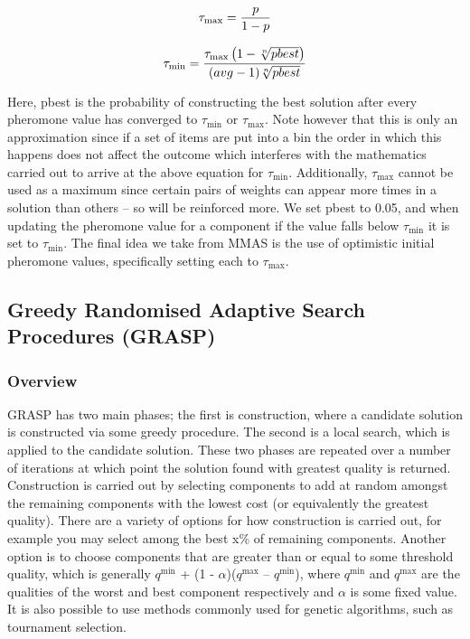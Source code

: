 \documentclass[12pt]{article}
\begin{document}
\[
\tau_{\max} =
\frac{p} {1-p}\\[10pt]
\]

\[
\tau_{\min} =
\frac{\tau_{\max}\left(1 - \sqrt[n]{pbest}\right)} {(avg - 1)\sqrt[n]{pbest}}\\[10pt]
\]

Here, pbest is the probability of constructing the best solution after every pheromone value has converged to $\tau_{\min}$ or $\tau_{\max}$. Note however that this is only an approximation since if a set of items are put into a bin the order in which this happens does not affect the outcome which interferes with the mathematics carried out to arrive at the above equation for $\tau_{\min}$. Additionally, $\tau_{\max}$ cannot be used as a maximum since certain pairs of weights can appear more times in a solution than others – so will be reinforced more. We set pbest to 0.05, and when updating the pheromone value for a component if the value falls below $\tau_{\min}$ it is set to $\tau_{\min}$. The final idea we take from MMAS is the use of optimistic initial pheromone values, specifically setting each to $\tau_{\max}$. 

\subsection{Greedy Randomised Adaptive Search Procedures (GRASP) }

\subsubsection{Overview}
GRASP has two main phases; the first is construction, where a candidate solution is constructed via some greedy procedure. The second is a local search, which is applied to the candidate solution. These two phases are repeated over a number of iterations at which point the solution found with greatest quality is returned. Construction is carried out by selecting components to add at random amongst the remaining components with the lowest cost (or equivalently the greatest quality). There are a variety of options for how construction is carried out, for example you may select among the best x\% of remaining components. Another option is to choose components that are greater than or equal to some threshold quality, which is generally $q^{\min}$ + (1 - $\alpha$)($q^{\max}$ – $q^{\min}$), where $q^{\min}$ and $q^{\max}$ are the qualities of the worst and best component respectively and $\alpha$ is some fixed value.  It is also possible to use methods commonly used for genetic algorithms, such as tournament selection.  
\end{document}
